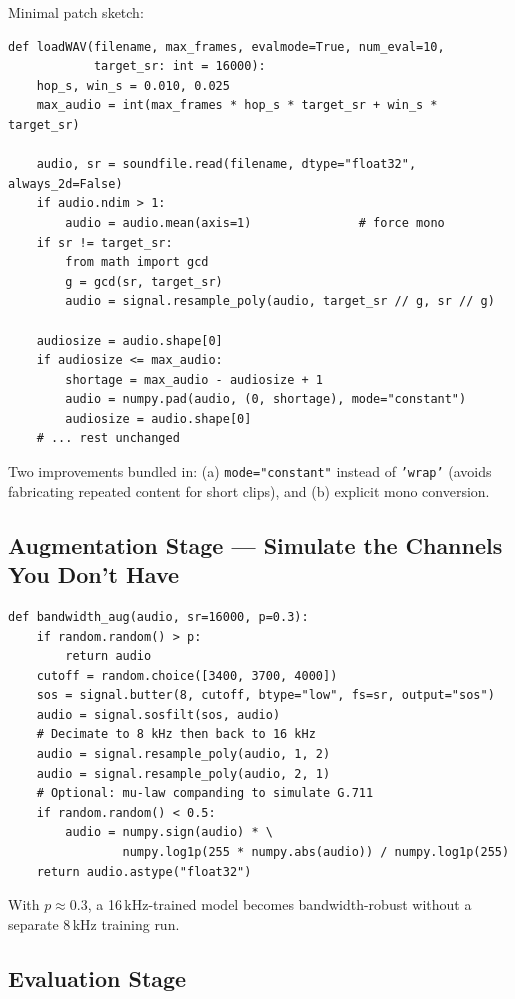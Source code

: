 \documentclass[11pt,a4paper]{article}
\begin{document}
Minimal patch sketch:
\begin{lstlisting}[style=python]
def loadWAV(filename, max_frames, evalmode=True, num_eval=10,
            target_sr: int = 16000):
    hop_s, win_s = 0.010, 0.025
    max_audio = int(max_frames * hop_s * target_sr + win_s * target_sr)

    audio, sr = soundfile.read(filename, dtype="float32", always_2d=False)
    if audio.ndim > 1:
        audio = audio.mean(axis=1)               # force mono
    if sr != target_sr:
        from math import gcd
        g = gcd(sr, target_sr)
        audio = signal.resample_poly(audio, target_sr // g, sr // g)

    audiosize = audio.shape[0]
    if audiosize <= max_audio:
        shortage = max_audio - audiosize + 1
        audio = numpy.pad(audio, (0, shortage), mode="constant")
        audiosize = audio.shape[0]
    # ... rest unchanged
\end{lstlisting}

Two improvements bundled in: (a) \texttt{mode="constant"} instead of \texttt{'wrap'} (avoids
fabricating repeated content for short clips), and (b) explicit mono conversion.

\subsection{Augmentation Stage --- Simulate the Channels You Don't Have}

\begin{lstlisting}[style=python]
def bandwidth_aug(audio, sr=16000, p=0.3):
    if random.random() > p:
        return audio
    cutoff = random.choice([3400, 3700, 4000])
    sos = signal.butter(8, cutoff, btype="low", fs=sr, output="sos")
    audio = signal.sosfilt(sos, audio)
    # Decimate to 8 kHz then back to 16 kHz
    audio = signal.resample_poly(audio, 1, 2)
    audio = signal.resample_poly(audio, 2, 1)
    # Optional: mu-law companding to simulate G.711
    if random.random() < 0.5:
        audio = numpy.sign(audio) * \
                numpy.log1p(255 * numpy.abs(audio)) / numpy.log1p(255)
    return audio.astype("float32")
\end{lstlisting}

With $p \approx 0.3$, a 16\,kHz-trained model becomes bandwidth-robust without a separate 8\,kHz
training run.

\subsection{Evaluation Stage}
\end{document}
